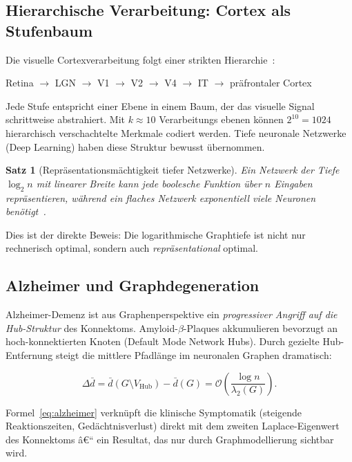 ﻿\documentclass[12pt,a4paper,twoside]{article}
\theoremstyle{definition}
\theoremstyle{plain}
\newtheorem{theorem}{Satz}[section]
\theoremstyle{remark}
\begin{document}
\subsection{Hierarchische Verarbeitung: Cortex als Stufenbaum}

Die visuelle Cortexverarbeitung folgt einer strikten
Hierarchie~\cite{Felleman1991}:

\begin{center}
  Retina $\to$ LGN $\to$ V1 $\to$ V2 $\to$ V4 $\to$ IT $\to$
  präfrontaler Cortex
\end{center}

Jede Stufe entspricht einer Ebene in einem Baum, der das visuelle
Signal schrittweise abstrahiert.  Mit $k \approx 10$ Verarbeitungs\-
ebenen können $2^{10} = 1024$ hierarchisch verschachtelte
Merkmale codiert werden.  Tiefe neuronale Netzwerke (Deep
Learning) haben diese Struktur bewusst übernommen.

\begin{theorem}[Repräsentationsmächtigkeit tiefer Netzwerke]
Ein Netzwerk der Tiefe $\log_2 n$ mit linearer Breite kann
jede boolesche Funktion über $n$ Eingaben repräsentieren,
während ein flaches Netzwerk exponentiell viele Neuronen
benötigt~\cite{Montufar2014}.
\end{theorem}

\noindent
Dies ist der direkte Beweis:  Die logarithmische Graphtiefe
ist nicht nur rechnerisch optimal, sondern auch
\emph{repräsentational} optimal.

\subsection{Alzheimer und Graphdegeneration}

Alzheimer-Demenz ist aus Graphenperspektive ein
\emph{progressiver Angriff auf die Hub-Struktur} des
Konnektoms.  Amyloid-$\beta$-Plaques akkumulieren
bevorzugt an hoch-konnektierten Knoten (Default Mode Network
Hubs).  Durch gezielte Hub-Entfernung steigt die mittlere
Pfadlänge im neuronalen Graphen dramatisch:

\begin{equation}
\label{eq:alzheimer}
  \Delta \bar{d} = \bar{d}(G \setminus V_{\text{Hub}}) -
                   \bar{d}(G)
                 = \mathcal{O}\!\left(\frac{\log n}{\lambda_2(G)}\right).
\end{equation}

Formel~\eqref{eq:alzheimer} verknüpft die klinische Symptomatik
(steigende Reaktionszeiten, Gedächtnisverlust) direkt mit dem
zweiten Laplace-Eigenwert des Konnektoms â€“ ein Resultat,
das nur durch Graphmodellierung sichtbar wird.
\end{document}
